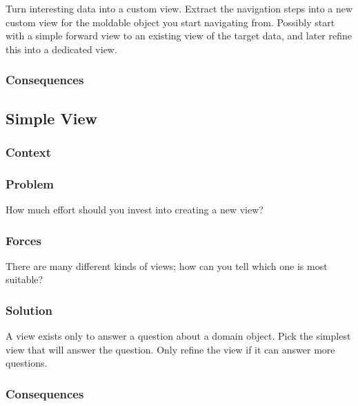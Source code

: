 \documentclass[sigconf]{acmart}
\begin{document}
Turn interesting data into a custom view.
Extract the navigation steps into a new custom view for the moldable object you start navigating from. Possibly start with a simple forward view to an existing view of the target data, and later refine this into a dedicated view.


\subsubsection*{Consequences}

\subsection*{Simple View}\label{pat:simpleView}
\subsubsection*{Context}
\subsubsection*{Problem}

How much effort should you invest into creating a new view?

\subsubsection*{Forces}

There are many different kinds of views; how can you tell which one is most suitable?

\subsubsection*{Solution}

A view exists only to answer a question about a domain object. Pick the simplest view that will answer the question. Only refine the view if it can answer more questions.


\subsubsection*{Consequences}

\end{document}
